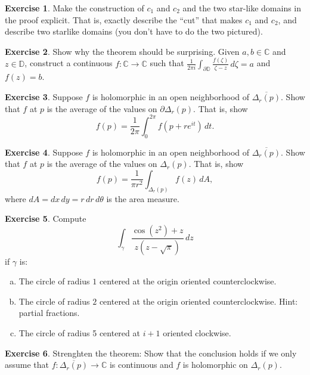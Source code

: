 \documentclass[12pt,openany]{book}
\newcommand{\C}{{\mathbb{C}}}
\newcommand{\D}{{\mathbb{D}}}
\newcommand{\myquote}[1]{``#1''}
\theoremstyle{plain}
\theoremstyle{remark}
\theoremstyle{definition}
\newenvironment{exbox}{%
    \def\FrameCommand{\vrule width 1pt \relax\hspace{10pt}}%
    \MakeFramed{\advance\hsize-\width\FrameRestore}%
}{%
    \endMakeFramed
}
\newenvironment{exparts}{%
    \leavevmode\begin{enumerate}[a),noitemsep,topsep=0pt,parsep=0pt,partopsep=0pt]
}{%
    \end{enumerate}
}
\theoremstyle{exercise}
\newtheorem{exercise}{Exercise}[section]
\theoremstyle{example}
\begin{document}
\begin{exbox}
\begin{exercise}
Make the construction of $c_1$ and $c_2$ and the two star-like domains
in the proof explicit.  That is, exactly describe the \myquote{cut} that makes
$c_1$ and $c_2$, and describe two starlike domains (you don't have to do the
two pictured).
\end{exercise}

\begin{exercise}
Show why the theorem should be surprising.  Given $a,b \in \C$ and $z \in \D$,
construct a continuous 
$f \colon \C \to \C$ such that $\frac{1}{2\pi i}\int_{\partial \D}
\frac{f(\zeta)}{\zeta -z} \, d\zeta = a$ and $f(z) = b$.
\end{exercise}

\begin{exercise}
Suppose $f$ is holomorphic in an open neighborhood of $\overline{\Delta_r(p)}$.
Show that $f$ at $p$ is the average of the values on $\partial \Delta_r(p)$.
That is, show
\begin{equation*}
f(p) = \frac{1}{2\pi} \int_0^{2\pi} f(p + r e^{it}) \, dt .
\end{equation*}
\end{exercise}

\begin{exercise}
Suppose $f$ is holomorphic in an open neighborhood of $\overline{\Delta_r(p)}$.
Show that $f$ at $p$ is the average of the values on $\Delta_r(p)$.
That is, show
\begin{equation*}
f(p) = \frac{1}{\pi r^2} \int_{\Delta_r(p)} f(z) \, dA ,
\end{equation*}
%
where $dA = dx \, dy = r \, dr \, d\theta$ is the area measure.
\end{exercise}

\begin{exercise}
Compute 
\begin{equation*}
\int_\gamma \frac{\cos ( z^2 ) +z}{z(z-\sqrt{\pi})} \, dz
\end{equation*}
if $\gamma$ is:
\begin{exparts}
\item
The circle of radius $1$ centered at the origin oriented
counterclockwise.
\item
The circle of radius $2$ centered at the origin oriented
counterclockwise.  Hint: partial fractions.
\item
The circle of radius 5 centered at $i+1$ oriented clockwise.
\end{exparts}
\end{exercise}

\begin{exercise} \label{exercise:strongerCIFdisc}
Strenghten the theorem:  Show that the conclusion holds if
we only assume that $f \colon \overline{\Delta_r(p)} \to \C$
is continuous and $f$ is holomorphic on $\Delta_r(p)$.
\end{exercise}
\end{exbox}
\end{document}
